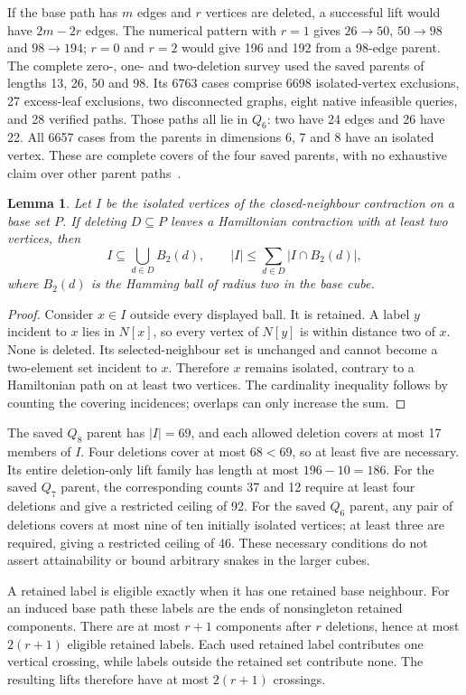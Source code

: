 \documentclass[11pt,a4paper]{article}
\newtheorem{lemma}[theorem]{Lemma}
\theoremstyle{definition}
\theoremstyle{remark}
\begin{document}
If the base path has $m$ edges and $r$ vertices are deleted, a successful
lift would have $2m-2r$ edges. The numerical pattern with $r=1$ gives
$26\to50$, $50\to98$ and $98\to194$; $r=0$ and $r=2$ would give 196 and
192 from a 98-edge parent. The complete zero-, one- and two-deletion
survey used the saved parents of lengths 13, 26, 50 and 98. Its 6763
cases comprise 6698 isolated-vertex exclusions, 27 excess-leaf
exclusions, two disconnected graphs, eight native infeasible queries,
and 28 verified paths. Those paths all lie in $Q_6$: two have 24 edges
and 26 have 22. All 6657 cases from the parents in dimensions 6, 7 and 8
have an isolated vertex. These are complete covers of the four saved
parents, with no exhaustive claim over other parent paths~\cite{research233}.

\begin{lemma}\label{lem:deletion233}
Let $I$ be the isolated vertices of the closed-neighbour contraction on
a base set $P$. If deleting $D\subseteq P$ leaves a Hamiltonian
contraction with at least two vertices, then
\[
 I\subseteq\bigcup_{d\in D} B_2(d),\qquad
 |I|\le\sum_{d\in D}|I\cap B_2(d)|,
\]
where $B_2(d)$ is the Hamming ball of radius two in the base cube.
\end{lemma}
\begin{proof}
Consider $x\in I$ outside every displayed ball. It is retained. A label
$y$ incident to $x$ lies in $N[x]$, so every vertex of $N[y]$ is within
distance two of $x$. None is deleted. Its selected-neighbour set is
unchanged and cannot become a two-element set incident to $x$.
Therefore $x$ remains isolated, contrary to a Hamiltonian path on at
least two vertices. The cardinality inequality follows by counting
the covering incidences; overlaps can only increase the sum.
\end{proof}

The saved $Q_8$ parent has $|I|=69$, and each allowed deletion covers
at most 17 members of $I$. Four deletions cover at most $68<69$, so
at least five are necessary. Its entire deletion-only lift family has
length at most $196-10=186$. For the saved $Q_7$ parent, the corresponding
counts 37 and 12 require at least four deletions and give a restricted
ceiling of 92. For the saved $Q_6$ parent, any pair of deletions covers
at most nine of ten initially isolated vertices; at least three are
required, giving a restricted ceiling of 46. These necessary conditions
do not assert attainability or bound arbitrary snakes in the larger cubes.

A retained label is eligible exactly when it has one retained base
neighbour. For an induced base path these labels are the ends of
nonsingleton retained components. There are at most $r+1$ components
after $r$ deletions, hence at most $2(r+1)$ eligible retained labels.
Each used retained label contributes one vertical crossing, while
labels outside the retained set contribute none. The resulting lifts
therefore have at most $2(r+1)$ crossings.
\end{document}
